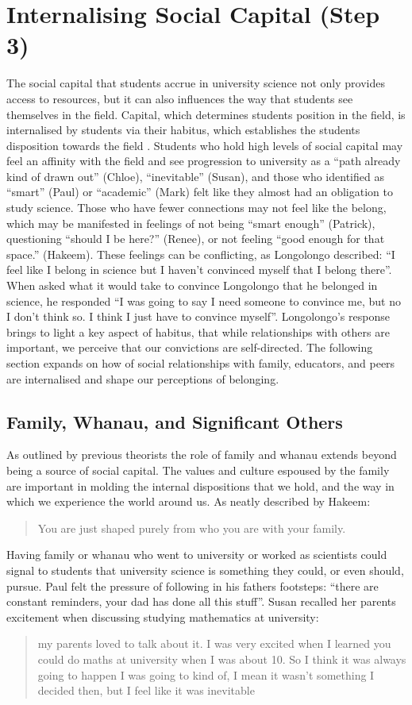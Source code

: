 \section{Internalising Social Capital (Step 3)}
The social capital that students accrue in university science not only provides access to resources, but it can also influences the way that students see themselves in the field. Capital, which determines students position in the field, is internalised by students via their habitus, which establishes the students disposition towards the field \cite{Bourdieu1992}. Students who hold high levels of social capital may feel an affinity with the field and see progression to university as a ``path already kind of drawn out'' (Chloe), ``inevitable'' (Susan), and those who identified as ``smart'' (Paul) or ``academic'' (Mark) felt like they almost had an obligation to study science. Those who have fewer connections may not feel like the belong, which may be manifested in feelings of not being ``smart enough'' (Patrick), questioning ``should I be here?'' (Renee), or not feeling ``good enough for that space.'' (Hakeem). These feelings can be conflicting, as Longolongo described: ``I feel like I belong in science but I haven’t convinced myself that I belong there''. When asked what it would take to convince Longolongo that he belonged in science, he responded ``I was going to say I need someone to convince me, but no I don’t think so. I think I just have to convince myself''. Longolongo's response brings to light a key aspect of habitus, that while relationships with others are important, we perceive that our convictions are self-directed. The following section expands on how of social relationships with family, educators, and peers are internalised and shape our perceptions of belonging.
 


\subsection{Family, Whanau, and Significant Others}
As outlined by previous theorists \citep{bourdieu1992invitation,Dimaggio1982,Archer_2013,Nash1999} the role of family and whanau extends beyond being a source of social capital. The values and culture espoused by the family are important in molding the internal dispositions that we hold, and the way in which we experience the world around us. As neatly described by Hakeem: \blockquote{You are just shaped purely from who you are with your family.} Having family or whanau who went to university or worked as scientists could signal to students that university science is something they could, or even should, pursue.  Paul felt the pressure of following in his fathers footsteps: ``there are constant reminders, your dad has done all this stuff''. Susan recalled her parents excitement when discussing studying mathematics at university: \blockquote{my parents loved to talk about it. I was very excited when I learned you could do maths at university when I was about 10. So I think it was always going to happen I was going to kind of, I mean it wasn't something I decided then, but I feel like it was inevitable}. 


